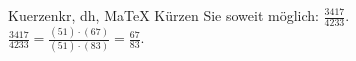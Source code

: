 \begin{MAufgabe}{Kuerzen}{kr, dh, MaTeX}
K\"urzen Sie soweit m\"oglich: $\frac{3417}{4233}$.\\ 
\ifLsg\MLoesung
\quad $\frac{3417}{4233}=\frac{(51)\cdot(67)}{(51)\cdot(83)}=\frac{67}{83}$.\else\relax\fi
 \end{MAufgabe}